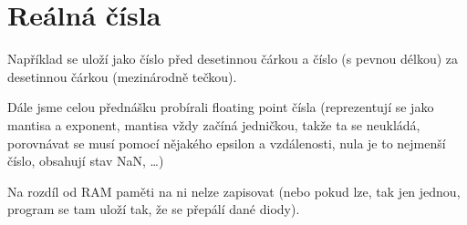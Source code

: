 \documentclass[12pt]{article}					%
\begin{document}
\section{Reálná čísla}
    \begin{definice}[Ukládání]
        Například se uloží jako číslo před desetinnou čárkou a číslo (s pevnou délkou) za desetinnou čárkou (mezinárodně tečkou).
    \end{definice}


    \begin{poznamka}
        Dále jsme celou přednášku probírali floating point čísla (reprezentují se jako mantisa a exponent, mantisa vždy začíná jedničkou, takže ta se neukládá, porovnávat se musí pomocí nějakého epsilon a vzdálenosti, nula je to nejmenší číslo, obsahují stav NaN, …)
    \end{poznamka}

    \begin{definice}
        Na rozdíl od RAM paměti na ni nelze zapisovat (nebo pokud lze, tak jen jednou, program se tam uloží tak, že se přepálí dané diody).
    \end{definice}
\end{document}
